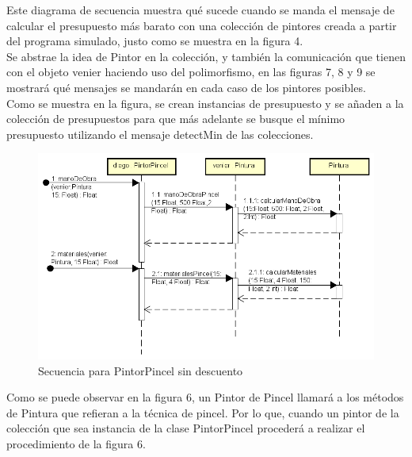 \documentclass[titlepage,a4paper]{article}
\begin{document}
Este diagrama de secuencia muestra qué sucede cuando se manda el mensaje de calcular el presupuesto más barato con una colección de pintores creada a partir del programa simulado, justo como se muestra en la figura 4.
\\Se abstrae la idea de Pintor en la colección, y también la comunicación que tienen con el objeto venier haciendo uso del polimorfismo, en las figuras 7, 8 y 9 se mostrará qué mensajes se mandarán en cada caso de los pintores posibles.
\\Como se muestra en la figura, se crean instancias de presupuesto y se añaden a la colección de presupuestos para que más adelante se busque el mínimo presupuesto utilizando el mensaje detectMin de las colecciones.


\begin{figure}[H]
\centering
\includegraphics[width=1.1\textwidth]{Secuencia4_1PincelSinDescuento.png}
\caption{\label{fig:seq02} Secuencia para PintorPincel sin descuento}
\end{figure}
Como se puede observar en la figura 6, un Pintor de Pincel llamará a los métodos de Pintura que refieran a la técnica de pincel.
Por lo que, cuando un pintor de la colección que sea instancia de la clase PintorPincel procederá a realizar el procedimiento de la figura 6.
\end{document}

